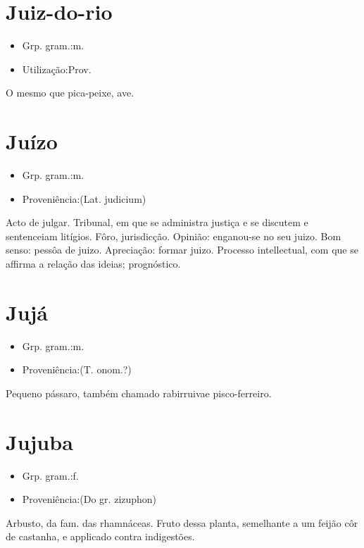 \documentclass{article}
\begin{document}
\section{Juiz-do-rio}
\begin{itemize}
\item {Grp. gram.:m.}
\end{itemize}
\begin{itemize}
\item {Utilização:Prov.}
\end{itemize}
O mesmo que \textunderscore pica-peixe\textunderscore , ave.
\section{Juízo}
\begin{itemize}
\item {Grp. gram.:m.}
\end{itemize}
\begin{itemize}
\item {Proveniência:(Lat. \textunderscore judicium\textunderscore )}
\end{itemize}
Acto de julgar.
Tribunal, em que se administra justiça e se discutem e sentenceiam litígios.
Fôro, jurisdicção.
Opinião: \textunderscore enganou-se no seu juizo\textunderscore .
Bom senso: \textunderscore pessôa de juizo\textunderscore .
Apreciação: \textunderscore formar juizo\textunderscore .
Processo intellectual, com que se affirma a relação das ideias; prognóstico.
\section{Jujá}
\begin{itemize}
\item {Grp. gram.:m.}
\end{itemize}
\begin{itemize}
\item {Proveniência:(T. onom.?)}
\end{itemize}
Pequeno pássaro, também chamado \textunderscore rabirruiva\textunderscore  e \textunderscore pisco-ferreiro\textunderscore .
\section{Jujuba}
\begin{itemize}
\item {Grp. gram.:f.}
\end{itemize}
\begin{itemize}
\item {Proveniência:(Do gr. \textunderscore zizuphon\textunderscore )}
\end{itemize}
Arbusto, da fam. das rhamnáceas.
Fruto dessa planta, semelhante a um feijão côr de castanha, e applicado contra indigestões.
\end{document}
